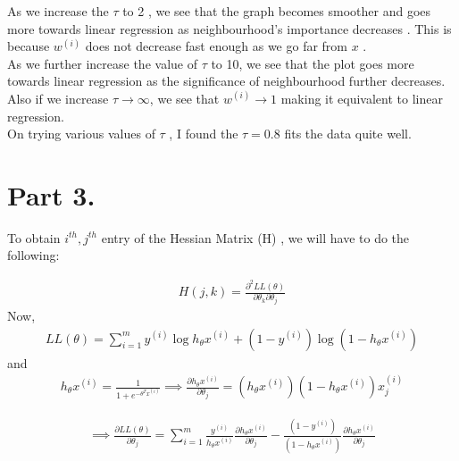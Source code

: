 \documentclass{article}
\begin{document}
\begin{enumerate}[label=(\alph*)]
         As we increase the $\tau$ to 2 , we see that the graph becomes smoother and goes more towards linear regression as neighbourhood's importance decreases  . This is because $w^{(i)}$ does not decrease fast enough as we go far from $x$ .\\ 
         
         As we further increase the value of $\tau$ to 10, we see that the plot goes more towards linear regression as the significance of neighbourhood further decreases. Also if we increase $\tau \to \infty$, we see that $w^{(i)} \to 1$ making it equivalent to linear regression.\\
         
         On trying various values of $\tau$ , I found the $\tau =0.8$ fits the data quite well.
         
    
    
                    
    
\end{enumerate}

\section{Part 3.}


To obtain $i^{th},j^{th}$ entry of the Hessian Matrix (H) , we will have to do the following:


        \begin{align*}
           H(j,k) = \frac{\partial ^2 LL(\theta)}{\partial \theta _k \partial \theta_j}
        \end{align*}  
        Now,
        \begin{align*}
          LL(\theta) = \sum_{i=1}^{m} y^{(i)}\log h_\theta x^{(i)} + (1 - y^{(i)})\log (1 - h_\theta x^{(i)})
        \end{align*}  
        and 
        \begin{align*}
           h_\theta x^{(i)}  = \frac{1}{1+ e^{-\theta^T x^{(i)}}} \implies \frac{\partial h_\theta x^{(i)}}{\partial \theta _j} = (h_\theta x^{(i)}) (1 -  h_\theta x^{(i)}) x^{(i)} _j
        \end{align*}  
        
        \begin{align*}
           \implies \frac{\partial LL(\theta)}{\partial \theta_j} = \sum_{i=1}^{m} \frac{y^{(i)}}{h_\theta x^{(i)}} \frac{\partial h_\theta x^{(i)}}{\partial \theta _j}  - \frac{(1-y^{(i)})}{(1-h_\theta x^{(i)})}\frac{\partial h_\theta x^{(i)}}{\partial \theta _j}
        \end{align*}  
        
\end{document}
